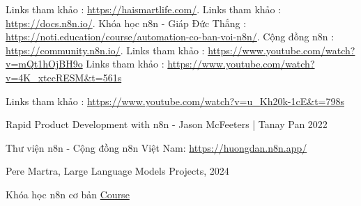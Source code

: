 \documentclass[a4paper,12pt,oneside]{book}
\begin{document}


\nopagecolor 

\begin{thebibliography}{99}

Links tham khảo :  \url{https://haismartlife.com/}.
Links tham khảo :  \url{https://docs.n8n.io/}.
Khóa học n8n - Giáp Đức Thắng :  \url{https://noti.education/course/automation-co-ban-voi-n8n/}.
Cộng đồng n8n :  
\url{https://community.n8n.io/}.
Links tham khảo :  \url{https://www.youtube.com/watch?v=mQt1hOjBH9o}
Links tham khảo :  \url{https://www.youtube.com/watch?v=4K_xtccRESM&t=561s}

Links tham khảo :  \url{https://www.youtube.com/watch?v=u_Kh20k-1cE&t=798s}

 Rapid Product Development with n8n - Jason McFeeters | Tanay Pan 2022

 Thư viện n8n - Cộng đồng n8n Việt Nam: \href{link}{https://huongdan.n8n.app/}

 Pere Martra, Large Language Models Projects, 2024

 Khóa học n8n cơ bản \href{https://www.youtube.com/playlist?list=PLlET0GsrLUL59YbxstZE71WszP3pVnZfI}{Course}

\end{thebibliography}

\begin{flushright}
\end{flushright}
\end{document}
